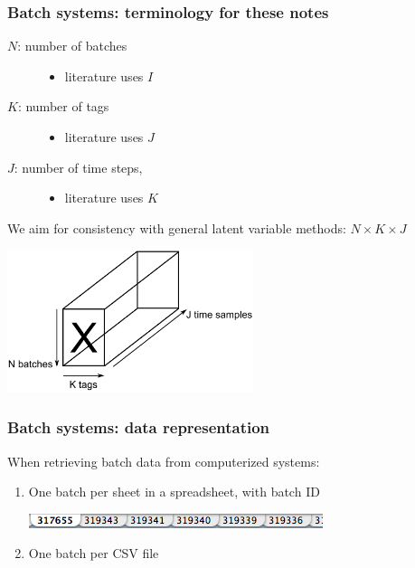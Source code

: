 \documentclass[handout, 12pt]{beamer}
\begin{document}
\begin{frame}\frametitle{Batch systems: terminology for these notes}

\begin{description} 
	
	\item[ \( N \): number of batches] 
	
		\begin{itemize}
			\item	literature uses \( I \)
		\end{itemize}
		
	\item[\( K \): number of tags] 
	
		\begin{itemize}
			\item	 literature uses \( J \)
		\end{itemize}
	
	\item[\( J \): number of time steps, ] 
	
		\begin{itemize}
			\item	 literature uses \( K \)
		\end{itemize}
\end{description}

We aim for consistency with general latent variable methods: \( N \times K \times J \)

\begin{center}
	\includegraphics[width=7.2cm]{images/batch-data-cube.png}
\end{center}

\end{frame}

\begin{frame}\frametitle{Batch systems: data representation}

When retrieving batch data from computerized systems:
\begin{enumerate}
	\item	One batch per sheet in a spreadsheet, with batch ID
			
			\includegraphics[scale=0.75]{images/batches-in-spreadsheets.png}
	
	\item	One batch per CSV file
\end{enumerate}
\end{frame}
\end{document}
